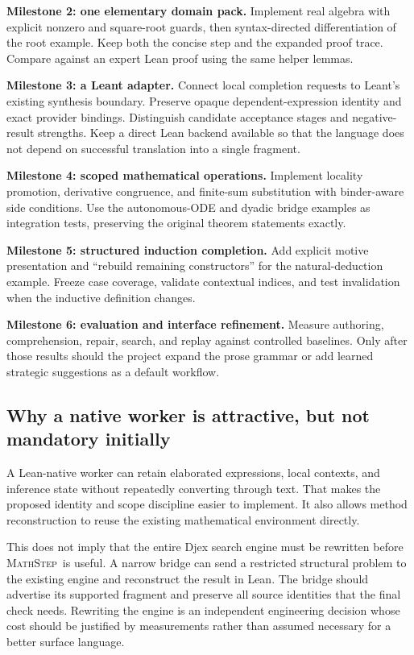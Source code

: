 \documentclass[11pt,a4paper]{article}
\theoremstyle{remark}
\newcommand{\ms}{\textsc{MathStep}}
\begin{document}
\textbf{Milestone 2: one elementary domain pack.} Implement real algebra with explicit nonzero and square-root guards, then syntax-directed differentiation of the root example. Keep both the concise step and the expanded proof trace. Compare against an expert Lean proof using the same helper lemmas.

\textbf{Milestone 3: a Leant adapter.} Connect local completion requests to Leant's existing synthesis boundary. Preserve opaque dependent-expression identity and exact provider bindings. Distinguish candidate acceptance stages and negative-result strengths. Keep a direct Lean backend available so that the language does not depend on successful translation into a single fragment.

\textbf{Milestone 4: scoped mathematical operations.} Implement locality promotion, derivative congruence, and finite-sum substitution with binder-aware side conditions. Use the autonomous-ODE and dyadic bridge examples as integration tests, preserving the original theorem statements exactly.

\textbf{Milestone 5: structured induction completion.} Add explicit motive presentation and ``rebuild remaining constructors'' for the natural-deduction example. Freeze case coverage, validate contextual indices, and test invalidation when the inductive definition changes.

\textbf{Milestone 6: evaluation and interface refinement.} Measure authoring, comprehension, repair, search, and replay against controlled baselines. Only after those results should the project expand the prose grammar or add learned strategic suggestions as a default workflow.

\subsection{Why a native worker is attractive, but not mandatory initially}
A Lean-native worker can retain elaborated expressions, local contexts, and inference state without repeatedly converting through text. That makes the proposed identity and scope discipline easier to implement. It also allows method reconstruction to reuse the existing mathematical environment directly.

This does not imply that the entire Djex search engine must be rewritten before \ms\ is useful. A narrow bridge can send a restricted structural problem to the existing engine and reconstruct the result in Lean. The bridge should advertise its supported fragment and preserve all source identities that the final check needs. Rewriting the engine is an independent engineering decision whose cost should be justified by measurements rather than assumed necessary for a better surface language.
\end{document}
